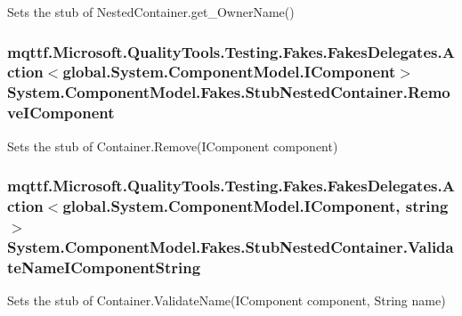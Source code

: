 Sets the stub of Nested\-Container.\-get\-\_\-\-Owner\-Name()

\hypertarget{class_system_1_1_component_model_1_1_fakes_1_1_stub_nested_container_a817eb8dbfe5089766d2286f4fa69d30c}{
\subsubsection[{Remove\-I\-Component}]{\setlength{\rightskip}{0pt plus 5cm}mqttf.\-Microsoft.\-Quality\-Tools.\-Testing.\-Fakes.\-Fakes\-Delegates.\-Action$<$global.\-System.\-Component\-Model.\-I\-Component$>$ System.\-Component\-Model.\-Fakes.\-Stub\-Nested\-Container.\-Remove\-I\-Component}}\label{class_system_1_1_component_model_1_1_fakes_1_1_stub_nested_container_a817eb8dbfe5089766d2286f4fa69d30c}


Sets the stub of Container.\-Remove(\-I\-Component component)

\hypertarget{class_system_1_1_component_model_1_1_fakes_1_1_stub_nested_container_a400fb74ebeab3082da8c98a7155e3693}{
\subsubsection[{Validate\-Name\-I\-Component\-String}]{\setlength{\rightskip}{0pt plus 5cm}mqttf.\-Microsoft.\-Quality\-Tools.\-Testing.\-Fakes.\-Fakes\-Delegates.\-Action$<$global.\-System.\-Component\-Model.\-I\-Component, string$>$ System.\-Component\-Model.\-Fakes.\-Stub\-Nested\-Container.\-Validate\-Name\-I\-Component\-String}}\label{class_system_1_1_component_model_1_1_fakes_1_1_stub_nested_container_a400fb74ebeab3082da8c98a7155e3693}


Sets the stub of Container.\-Validate\-Name(\-I\-Component component, String name)




